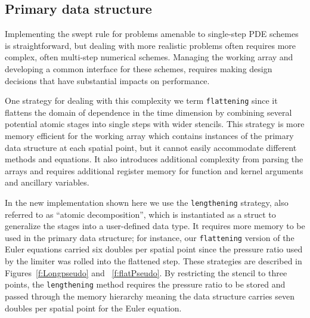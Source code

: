 
\subsection{Primary data structure} \label{sec:hPrimaryData}

Implementing the swept rule for problems amenable to single-step PDE schemes is straightforward,
but dealing with more realistic problems often requires more complex, often multi-step numerical schemes.
Managing the working array and developing a common interface for these schemes, requires making design decisions that have substantial impacts on performance.

One strategy for dealing with this complexity we term \texttt{flattening} since it flattens the
domain of dependence in the time dimension by combining several potential atomic stages into
single steps with wider stencils. This strategy is more memory efficient for the working array which contains instances of the primary data structure at each spatial point,
but it cannot easily accommodate different methods and equations.
It also introduces additional complexity from parsing the arrays and requires additional register memory
for function and kernel arguments and ancillary variables.


In the new implementation shown here we use the \texttt{lengthening} strategy, also referred to as ``atomic decomposition'', which is instantiated as a struct to generalize the stages into a user-defined data type.
It requires more memory to be used in the primary data structure; for instance, our \texttt{flattening} version
of the Euler equations carried six doubles per spatial point since the pressure ratio used by the
limiter was rolled into the flattened step.
These strategies are described in Figures~\ref{f:Longpseudo} and ~\ref{f:flatPseudo}.
By restricting the stencil to three points, the \texttt{lengthening} method requires the pressure ratio
to be stored and passed through the memory hierarchy meaning the data structure carries seven doubles per spatial point for the Euler equation.

